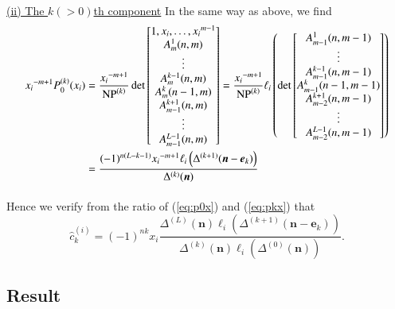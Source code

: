\documentclass[12pt]{article}
\numberwithin{equation}{section}
\begin{document}
\paragraph{}
\noindent
\underline{(ii) The $k(>0)$th component}
\quad 
In the same way as above, we find
\begin{align}
{x_i}^{-m+1}
P_0^{(k)}(x_i)
&=
\frac{ {x_i}^{-m+1} }{ {\rm NP}^{(k)} }
\det 
\begin{bmatrix}
1,x_i, \ldots, {x_i}^{m-1}
\\
A^1_{m}(n,m) 
\\
\vdots
\\
A^{k-1}_{m}(n,m)
\\ 
A^{k}_{m}(n-1,m)
\\ 
A^{k+1}_{m-1}(n,m)
\\
\vdots \\
A^{L-1}_{m-1}(n,m) 
\end{bmatrix}
=
\frac{ {x_i}^{-m+1} }{ {\rm NP}^{(k)} }
\ell_i 
\left(
\det 
\begin{bmatrix}
A^1_{m-1}(n,m-1) 
\\
\vdots
\\
A^{k-1}_{m-1}(n,m-1)
\\ 
A^{k}_{m-1}(n-1,m-1)
\\ 
A^{k+1}_{m-2}(n,m-1)
\\
\vdots \\
A^{L-1}_{m-2}(n,m-1) 
\end{bmatrix}
\right)
\nonumber
\\
&=
\frac{ (-1)^{n(L-k-1)} {x_i}^{-m+1} \ell_i \left(\Delta^{(k+1)}( {\boldsymbol n}-{\boldsymbol e}_k)  \right) }{ \Delta^{(k)} ( {\boldsymbol n}) }
\label{eq:pkx}
\end{align}



\paragraph{}
Hence we verify
from the ratio of
 (\ref{eq:p0x}) and (\ref{eq:pkx})
 that
\[
\hat{c}^{(i)}_k=
(-1)^{nk}
x_i
\frac{\Delta^{(L)} ({\boldsymbol n})
 \ell_i \left( \Delta^{(k+1)} ({\boldsymbol n}-{\boldsymbol e}_k) \right)
  }{\Delta^{(k)} ({\boldsymbol n}) 
  \ell_i \left( \Delta^{(0)} ({\boldsymbol n}) \right) } .
\]






\subsection{Result}
\label{subsect:result}
\end{document}
